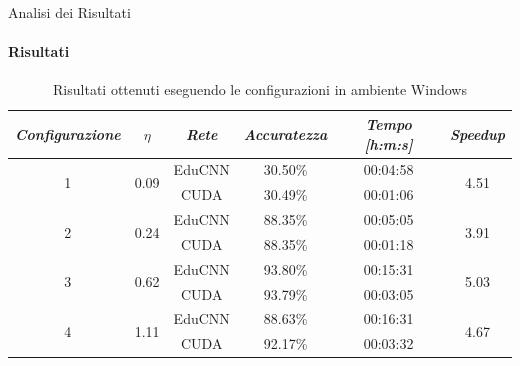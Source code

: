 \documentclass[
 ]{beamer}
\begin{document}
\begin{frame}{Analisi dei Risultati}
    \framesubtitle{Risultati}

        \begin{table}
            \centering
            \renewcommand\arraystretch{1.3}
            \small
            \begin{tabular}{| c | c | c | c | c | c |}
                \hline
                \emph{Configurazione} & $\eta$ & \emph{Rete} & \emph{Accuratezza} & \emph{Tempo [h:m:s]} & \emph{Speedup} \\
                \hline
                \multirow{2}{*}{1} & \multirow{2}{*}{0.09} & EduCNN & 30.50\% & 00:04:58 & \multirow{2}{*}{4.51} \\ \cline{3-5} 
                                   &                       & CUDA   & 30.49\% & 00:01:06  & \\
                \hline
                \multirow{2}{*}{2} & \multirow{2}{*}{0.24} & EduCNN & 88.35\% & 00:05:05 & \multirow{2}{*}{3.91} \\ \cline{3-5} 
                                   &                       & CUDA   & 88.35\% & 00:01:18  & \\
                \hline
                \multirow{2}{*}{3} & \multirow{2}{*}{0.62} & EduCNN & 93.80\% & 00:15:31 & \multirow{2}{*}{5.03} \\ \cline{3-5} 
                                   &                       & CUDA   & 93.79\% & 00:03:05  & \\
                \hline
                \multirow{2}{*}{4} & \multirow{2}{*}{1.11} & EduCNN & 88.63\% & 00:16:31 & \multirow{2}{*}{4.67} \\ \cline{3-5} 
                                   &                       & CUDA   & 92.17\% & 00:03:32  & \\
                \hline
            \end{tabular}
            \caption{Risultati ottenuti eseguendo le configurazioni in ambiente Windows}          
        \end{table}    
\end{frame}
\end{document}
